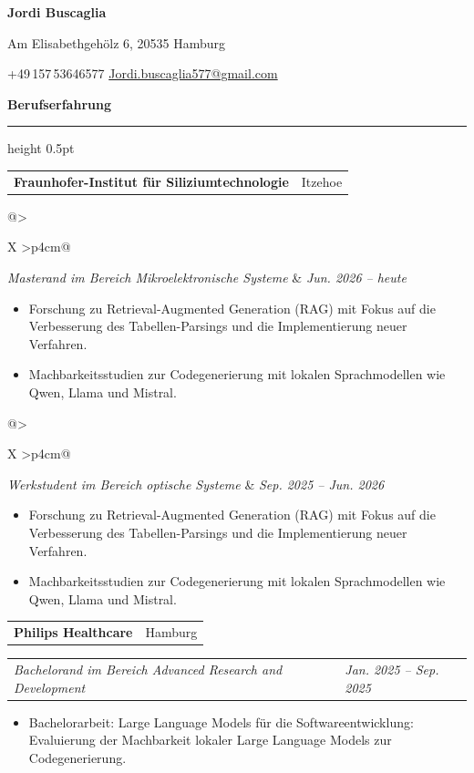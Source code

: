 \documentclass[10pt,a4paper]{article}
\makeatletter
\newcommand{\cvsection}[1]{%
  \par\addvspace{10pt}%
  {\large\bfseries #1}\par\nobreak
  \vspace{2pt}\hrule height 0.5pt\relax
  \vspace{5pt}%
}
\newcommand{\cvemployer}[2]{%
  \noindent\begin{tabularx}{\linewidth}{@{}>{\raggedright\arraybackslash}X r@{}}
    \textbf{#1} & #2 \\ 
  \end{tabularx}\par\nobreak
}
\newcommand{\cvrole}[2]{%
  \noindent\begin{tabularx}{\linewidth}{@{}>{\raggedright\arraybackslash}X >{\raggedleft\arraybackslash}p{4cm}@{}}
    \textit{#1} & \textit{#2} \\ 
  \end{tabularx}\par\nobreak
}
\newcommand{\cventry}[4]{%
  \cvemployer{#1}{#2}%
  \cvrole{#3}{#4}%
}
\makeatother
\begin{document}
\begin{center}
  {\LARGE\bfseries Jordi Buscaglia}\par
  \vspace{5pt}
  {\small Am Elisabethgehölz 6, 20535 Hamburg\par
  \vspace{2pt}
  +49\,157\,53646577\enspace\textbar\enspace
  \href{mailto:Jordi.buscaglia577@gmail.com}{Jordi.buscaglia577@gmail.com}}
\end{center}

\cvsection{Berufserfahrung}

\cventry{Fraunhofer-Institut für Siliziumtechnologie}{Itzehoe}
  {Masterand im Bereich Mikroelektronische Systeme}{Jun. 2026 -- heute}
\begin{itemize}
  \item Forschung zu Retrieval-Augmented Generation (RAG) mit Fokus auf die Verbesserung des Tabellen-Parsings und die Implementierung neuer Verfahren.
  \item Machbarkeitsstudien zur Codegenerierung mit lokalen Sprachmodellen wie Qwen, Llama und Mistral.
\end{itemize}
\vspace{0.5cm}

\cvrole{Werkstudent im Bereich optische Systeme}{Sep. 2025 -- Jun. 2026}
\begin{itemize}
  \item Forschung zu Retrieval-Augmented Generation (RAG) mit Fokus auf die Verbesserung des Tabellen-Parsings und die Implementierung neuer Verfahren.
  \item Machbarkeitsstudien zur Codegenerierung mit lokalen Sprachmodellen wie Qwen, Llama und Mistral.
\end{itemize}
\vspace{0.5cm}


\cvemployer{Philips Healthcare}{Hamburg}
\cvrole{Bachelorand im Bereich Advanced Research and Development}{Jan. 2025 -- Sep. 2025}
\begin{itemize}
  \item Bachelorarbeit: \glqq Large Language Models für die Softwareentwicklung: Evaluierung der Machbarkeit lokaler Large Language Models zur Codegenerierung\grqq.
\end{itemize}
\vspace{0.5cm}
\end{document}
